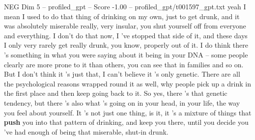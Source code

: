 \begin{textsample}{NEG Dim 5 – profiled\_gpt – Score -1.00 – profiled\_gpt/t001597\_gpt.txt}  \label{ex:f5_neg_026}
yeah I mean I used to do that thing of drinking on my own, just to get drunk, and it was absolutely miserable really, very insular, you shut yourself off from everyone and everything.
I don't do that now, I ’ve stopped that side of it, and these days I only very rarely get really drunk, you know, properly out of it.
I do think there ’s something in what you were saying about it being in your DNA – some people clearly are more prone to it than others, you can see that in families and so on.
But I don't think it ’s just that, I can't believe it ’s only genetic.
There are all the psychological reasons wrapped round it as well, why people pick up a drink in the first place and then keep going back to it.
So yes, there ’s that genetic tendency, but there ’s also what ’s going on in your head, in your life, the way you feel about yourself.
It ’s not just one thing, is it, it ’s a mixture of things that \textbf{push} you into that pattern of drinking, and keep you there, until you decide you ’ve had enough of being that miserable, shut‑in drunk.

\end{textsample}
